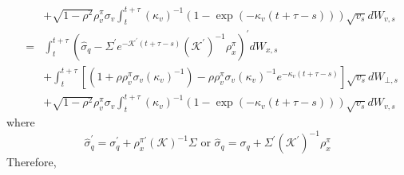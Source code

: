 \documentclass{article}
\begin{document}
\begin{eqnarray*}
&&+\sqrt{1-\rho ^{2}}\rho _{v}^{\pi }\sigma _{v}\int_{t}^{t+\tau }\left(
\kappa _{v}\right) ^{-1}\left( 1-\exp \left( -\kappa _{v}\left( t+\tau
-s\right) \right) \right) \sqrt{v_{s}}dW_{v,s} \\
&=&\int_{t}^{t+\tau }\left( \widehat{\sigma }_{q}-\Sigma ^{\prime }e^{-%
\mathcal{K}^{\prime }\left( t+\tau -s\right) }\left( \mathcal{K}^{\prime
}\right) ^{-1}\rho _{x}^{\pi }\right) ^{\prime }dW_{x,s} \\
&&+\int_{t}^{t+\tau }\left[ \left( 1+\rho \rho _{v}^{\pi }\sigma _{v}\left(
\kappa _{v}\right) ^{-1}\right) -\rho \rho _{v}^{\pi }\sigma _{v}\left(
\kappa _{v}\right) ^{-1}e^{-\kappa _{v}\left( t+\tau -s\right) }\right] 
\sqrt{v_{s}}dW_{\bot ,s} \\
&&+\sqrt{1-\rho ^{2}}\rho _{v}^{\pi }\sigma _{v}\int_{t}^{t+\tau }\left(
\kappa _{v}\right) ^{-1}\left( 1-\exp \left( -\kappa _{v}\left( t+\tau
-s\right) \right) \right) \sqrt{v_{s}}dW_{v,s}
\end{eqnarray*}%
where%
\begin{equation*}
\widehat{\sigma }_{q}^{\prime }=\sigma _{q}^{\prime }+\rho _{x}^{\pi \prime
}\left( \mathcal{K}\right) ^{-1}\Sigma \text{ or }\widehat{\sigma }%
_{q}=\sigma _{q}+\Sigma ^{\prime }\left( \mathcal{K}^{\prime }\right)
^{-1}\rho _{x}^{\pi }
\end{equation*}%
Therefore,%
\end{document}
